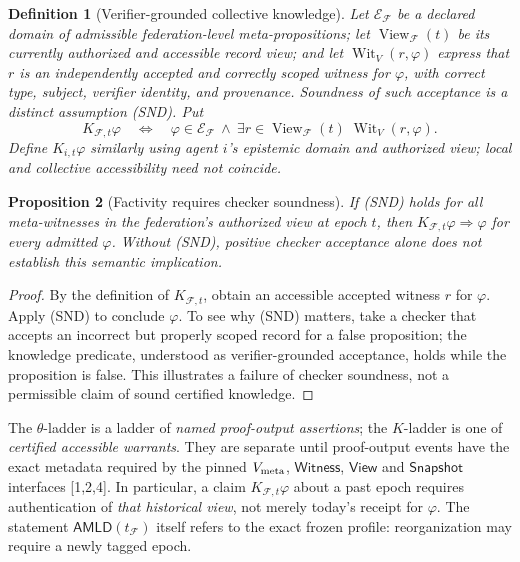 \documentclass[10pt,letterpaper]{article}
\newtheorem{definition}{Definition}[section]
\newtheorem{proposition}[definition]{Proposition}
\theoremstyle{remark}\newtheorem{remark}[definition]{Remark}
\newcommand{\AMLD}{\mathsf{AMLD}}
\newcommand{\F}{\mathcal{F}}
\newcommand{\View}{\operatorname{View}}
\newcommand{\Wit}{\operatorname{Wit}}
\newcommand{\E}{\mathcal{E}}
\begin{document}
\begin{definition}[Verifier-grounded collective knowledge]
Let $\E_{\F}$ be a declared domain of admissible federation-level meta-propositions; let $\View_{\F}(t)$ be its \emph{currently authorized and accessible} record view; and let $\Wit_V(r,\varphi)$ express that $r$ is an independently accepted and correctly scoped witness for $\varphi$, with correct type, subject, verifier identity, and provenance. Soundness of such acceptance is a distinct assumption (SND). Put
\[
\boxed{K_{\F,t}\varphi\quad\Longleftrightarrow\quad
\varphi\in\E_{\F}\ \wedge\ \exists r\in\View_{\F}(t)\;\Wit_V(r,\varphi).}
\]
Define $K_{i,t}\varphi$ similarly using agent $i$'s epistemic domain and authorized view; local and collective accessibility need not coincide.
\end{definition}

\begin{proposition}[Factivity requires checker soundness]
If (SND) holds for all meta-witnesses in the federation's authorized view at epoch $t$, then $K_{\F,t}\varphi\Rightarrow\varphi$ for every admitted $\varphi$. Without (SND), positive checker acceptance alone does not establish this semantic implication.
\end{proposition}
\begin{proof}
By the definition of $K_{\F,t}$, obtain an accessible accepted witness $r$ for $\varphi$. Apply (SND) to conclude $\varphi$. To see why (SND) matters, take a checker that accepts an incorrect but properly scoped record for a false proposition; the knowledge predicate, understood as verifier-grounded acceptance, holds while the proposition is false. This illustrates a failure of checker soundness, not a permissible claim of sound certified knowledge.
\end{proof}

The $\theta$-ladder is a ladder of \emph{named proof-output assertions}; the $K$-ladder is one of \emph{certified accessible warrants}. They are separate until proof-output events have the exact metadata required by the pinned $V_{\rm meta}$, $\mathsf{Witness}$, $\mathsf{View}$ and $\mathsf{Snapshot}$ interfaces [1,2,4]. In particular, a claim $K_{\F,t}\varphi$ about a past epoch requires authentication of \emph{that historical view}, not merely today's receipt for $\varphi$. The statement $\AMLD(t_{\F})$ itself refers to the exact frozen profile: reorganization may require a newly tagged epoch.
\end{document}
